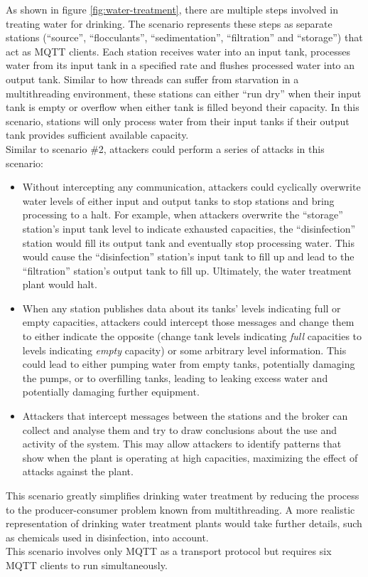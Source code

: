 As shown in figure \ref{fig:water-treatment}, there are multiple steps involved in treating water for drinking. The scenario represents these steps as separate stations (\enquote{source}, \enquote{flocculants}, \enquote{sedimentation}, \enquote{filtration} and \enquote{storage}) that act as \ac{MQTT} clients. Each station receives water into an input tank, processes water from its input tank in a specified rate and flushes processed water into an output tank. Similar to how threads can suffer from starvation in a multithreading environment, these stations can either \enquote{run dry} when their input tank is empty or overflow when either tank is filled beyond their capacity. In this scenario, stations will only process water from their input tanks if their output tank provides sufficient available capacity.\\
Similar to scenario \#2, attackers could perform a series of attacks in this scenario:
\begin{itemize}
    \item Without intercepting any communication, attackers could cyclically overwrite water levels of either input and output tanks to stop stations and bring processing to a halt. For example, when attackers overwrite the \enquote{storage} station's input tank level to indicate exhausted capacities, the \enquote{disinfection} station would fill its output tank and eventually stop processing water. This would cause the \enquote{disinfection} station's input tank to fill up and lead to the \enquote{filtration} station's output tank to fill up. Ultimately, the water treatment plant would halt.
    \item When any station publishes data about its tanks' levels indicating full or empty capacities, attackers could intercept those messages and change them to either indicate the opposite (change tank levels indicating \emph{full} capacities to levels indicating \emph{empty} capacity) or some arbitrary level information. This could lead to either pumping water from empty tanks, potentially damaging the pumps, or to overfilling tanks, leading to leaking excess water and potentially damaging further equipment.
    \item Attackers that intercept messages between the stations and the broker can collect and analyse them and try to draw conclusions about the use and activity of the system. This may allow attackers to identify patterns that show when the plant is operating at high capacities, maximizing the effect of attacks against the plant.
\end{itemize}
This scenario greatly simplifies drinking water treatment by reducing the process to the producer-consumer problem known from multithreading. A more realistic representation of drinking water treatment plants would take further details, such as chemicals used in disinfection, into account.\\
This scenario involves only \ac{MQTT} as a transport protocol but requires six \ac{MQTT} clients to run simultaneously.

